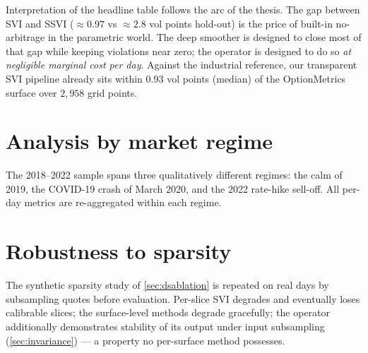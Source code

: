 Interpretation of the headline table follows the arc of the thesis. The gap
between SVI and SSVI ($\approx0.97$ vs $\approx2.8$ vol points hold-out) is
the price of built-in no-arbitrage in the parametric world. The deep
smoother is designed to close most of that gap while keeping violations near
zero; the operator is designed to do so \emph{at negligible marginal cost per
day}. Against the industrial reference, our transparent SVI pipeline already
sits within $0.93$ vol points (median) of the OptionMetrics surface over
$2{,}958$ grid points.

\section{Analysis by market regime}
The 2018--2022 sample spans three qualitatively different regimes: the calm
of 2019, the COVID-19 crash of March 2020, and the 2022 rate-hike sell-off.
All per-day metrics are re-aggregated within each regime.

\section{Robustness to sparsity}
The synthetic sparsity study of \cref{sec:dsablation} is repeated on real
days by subsampling quotes before evaluation. Per-slice SVI degrades and
eventually loses calibrable slices; the surface-level methods degrade
gracefully; the operator additionally demonstrates stability of its output
under input subsampling (\cref{sec:invariance}) --- a property no per-surface
method possesses.

